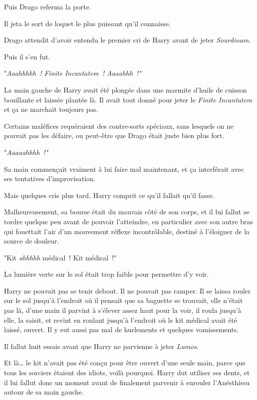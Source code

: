 Puis Drago referma la porte.

Il jeta le sort de loquet le plus puissant qu'il connaisse.

Drago attendit d'avoir entendu le premier cri de Harry avant de jeter \emph{Sourdinam}.

Puis il s'en fut.

\later

"\emph{Aaahhhhh~! Finite Incantatem~! Aaaahhh~!"}

La main gauche de Harry avait été plongée dans une marmite d'huile de cuisson bouillante et laissée plantée là. Il avait tout donné pour jeter le \emph{Finite Incantatem} et ça ne marchait toujours pas.

Certains maléfices requéraient des contre-sorts spéciaux, sans lesquels on ne pouvait pas les défaire, ou peut-être que Drago était juste bien plus fort.

"\emph{Aaaaahhhh~!"}

Sa main commençait vraiment à lui faire mal maintenant, et ça interférait avec ses tentatives d'improvisation.

Mais quelques cris plus tard, Harry comprit ce qu'il fallait qu'il fasse.

Malheureusement, sa bourse était du mauvais côté de son corps, et il lui fallut se tordre quelque peu avant de pouvoir l'atteindre, en particulier avec son autre bras qui fouettait l'air d'un mouvement réflexe incontrôlable, destiné à l'éloigner de la source de douleur.

"Kit \emph{ahhhhh} médical~! Kit médical~!"

La lumière verte sur le sol était trop faible pour permettre d'y voir.

Harry ne pouvait pas se tenir debout. Il ne pouvait pas ramper. Il se laissa rouler sur le sol jusqu'à l'endroit où il pensait que sa baguette se trouvait, elle n'était pas là, d'une main il parvint à s'élever assez haut pour la voir, il roula jusqu'à elle, la saisit, et revint en roulant jusqu'à l'endroit où le kit médical avait été laissé, ouvert. Il y eut aussi pas mal de hurlements et quelques vomissements.

Il fallut huit essais avant que Harry ne parvienne à jeter \emph{Lumos}.

Et là… le kit n'avait pas été conçu pour être ouvert d'une seule main, parce que tous les sorciers étaient des idiots, voilà pourquoi. Harry dut utiliser ses dents, et il lui fallut donc un moment avant de finalement parvenir à enrouler l'Anésthissu autour de sa main gauche.

